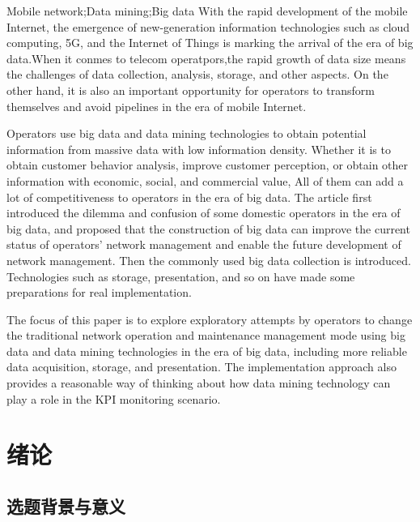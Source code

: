 \documentclass{HustGraduPaper}
\begin{document}
    \begin{enabstract}{Mobile network;Data mining;Big data}
        With the rapid development of the mobile Internet, the emergence of new-generation information technologies such as cloud computing, 
        5G, and the Internet of Things is marking the arrival of the era of big data.When it conmes to telecom operatpors,the rapid growth of data size means the challenges of data collection,
        analysis, storage, and other aspects. On the other hand, it is also an important opportunity for operators to transform themselves and avoid pipelines in the era of mobile Internet.

        Operators use big data and data mining technologies to obtain potential information from massive data with low information density. 
        Whether it is to obtain customer behavior analysis, improve customer perception, or obtain other information with economic, 
        social, and commercial value, All of them can add a lot of competitiveness to operators in the era of big data. 
        The article first introduced the dilemma and confusion of some domestic operators in the era of big data, 
        and proposed that the construction of big data can improve the current status of operators' network management and enable the future development of network management. 
        Then the commonly used big data collection is introduced. Technologies such as storage, presentation, and so on have made some preparations for real implementation.

        The focus of this paper is to explore exploratory attempts by operators to change the traditional network operation and maintenance management mode using big data 
        and data mining technologies in the era of big data, including more reliable data acquisition, storage, and presentation. 
        The implementation approach also provides a reasonable way of thinking about how data mining technology can play a role in the KPI monitoring scenario.
    \end{enabstract}

    \tableofcontents
    \clearpage

    \section{绪论}
    
    \subsection{选题背景与意义}
\end{document}
